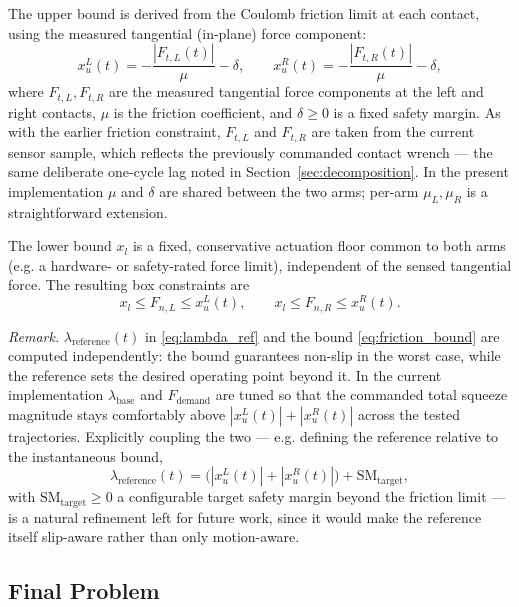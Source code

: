 \documentclass[conference]{IEEEtran}
\begin{document}
The upper bound is derived from the Coulomb friction limit at each contact, using the measured tangential (in-plane) force component:
\begin{equation}
x_u^L(t) = -\frac{|F_{t,L}(t)|}{\mu} - \delta,
\qquad
x_u^R(t) = -\frac{|F_{t,R}(t)|}{\mu} - \delta,
\label{eq:friction_bound}
\end{equation}
where $F_{t,L},F_{t,R}$ are the measured tangential force components at the left and right contacts, $\mu$ is the friction coefficient, and $\delta\ge0$ is a fixed safety margin. As with the earlier friction constraint, $F_{t,L}$ and $F_{t,R}$ are taken from the current sensor sample, which reflects the previously commanded contact wrench — the same deliberate one-cycle lag noted in Section~\ref{sec:decomposition}. In the present implementation $\mu$ and $\delta$ are shared between the two arms; per-arm $\mu_L,\mu_R$ is a straightforward extension.

The lower bound $x_l$ is a fixed, conservative actuation floor common to both arms (e.g. a hardware- or safety-rated force limit), independent of the sensed tangential force. The resulting box constraints are
\begin{equation}
x_l \le F_{n,L} \le x_u^L(t),
\qquad
x_l \le F_{n,R} \le x_u^R(t).
\label{eq:box_constraints}
\end{equation}

\emph{Remark.} $\lambda_{\mathrm{reference}}(t)$ in \eqref{eq:lambda_ref} and the bound \eqref{eq:friction_bound} are computed independently: the bound guarantees non-slip in the worst case, while the reference sets the desired operating point beyond it. In the current implementation $\lambda_{\mathrm{base}}$ and $F_{\mathrm{demand}}$ are tuned so that the commanded total squeeze magnitude stays comfortably above $|x_u^L(t)|+|x_u^R(t)|$ across the tested trajectories. Explicitly coupling the two — e.g. defining the reference relative to the instantaneous bound,
\begin{equation}
\lambda_{\mathrm{reference}}(t) = \big(|x_u^L(t)|+|x_u^R(t)|\big) + \mathrm{SM}_{\mathrm{target}},
\end{equation}
with $\mathrm{SM}_{\mathrm{target}}\ge0$ a configurable target safety margin beyond the friction limit — is a natural refinement left for future work, since it would make the reference itself slip-aware rather than only motion-aware.

\subsection{Final Problem}
\end{document}
